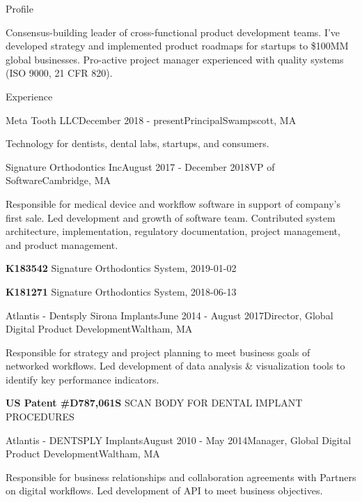 \documentclass{resume}
\begin{document}
  
\begin{rSection}{Profile}
\item Consensus-building leader of cross-functional product development teams. I've developed strategy and implemented product roadmaps for startups to \$100MM global businesses. Pro-active project manager experienced with quality systems (ISO 9000, 21 CFR 820).
\end{rSection}

\begin{rSection}{Experience}

\begin{rSubsection}{Meta Tooth LLC}{December 2018 - present}{Principal}{Swampscott, MA}
\item Technology for dentists, dental labs, startups, and consumers.
\end{rSubsection}

\begin{rSubsection}{Signature Orthodontics Inc}{August 2017 - December 2018}{VP of Software}{Cambridge, MA}
\item Responsible for medical device and workflow software in support of company's first sale.  Led development and growth of software team. Contributed system architecture, implementation, regulatory documentation, project management, and product management.
\item \textbf{K183542} Signature Orthodontics System, 2019-01-02
\item \textbf{K181271} Signature Orthodontics System, 2018-06-13
\end{rSubsection}


\begin{rSubsection}{Atlantis - Dentsply Sirona Implants}{June 2014 - August 2017}{Director, Global Digital Product Development}{Waltham, MA}
\item Responsible for strategy and project planning to meet business goals of networked workflows.  Led development of data analysis \& visualization tools to identify key performance indicators.
\item \textbf{US Patent \#D787,061S} SCAN BODY FOR DENTAL IMPLANT PROCEDURES
\end{rSubsection}

\begin{rSubsection}{Atlantis - DENTSPLY Implants}{August 2010 - May 2014}{Manager, Global Digital Product Development}{Waltham, MA}
\item Responsible for business relationships and collaboration agreements with Partners on digital workflows.  Led development of API to meet business objectives.
\end{rSubsection}



\end{rSection}
\end{document}
